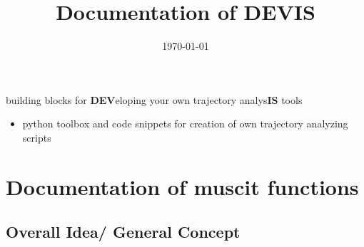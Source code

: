 \documentclass{article}
\begin{document}
%
\title{Documentation of DEVIS}

%
%
%
%
 \date{\today}                     %
%
%


\maketitle

%
%
\begin{center} 
%
%
%
%
\vspace{1cm}
%
{ \large building blocks for \textbf{DEV}eloping your own trajectory analys\textbf{IS} tools}


\vspace{3cm}
\begin{itemize}
%
%
%
 \item python toolbox and code snippets for creation of own trajectory analyzing scripts
\end{itemize}

\end{center}
\newpage



 \newpage
\newpage




 \newpage


\tableofcontents 

\newpage
%
%
%
%
%
%
%
%
%
%
%
%
%
%
%
%
%
%
%
%



\section{Documentation of   muscit functions}
%
%
%

%
%
%
%
%

% 
% 

\subsection{Overall Idea/ General Concept}
\end{document}
